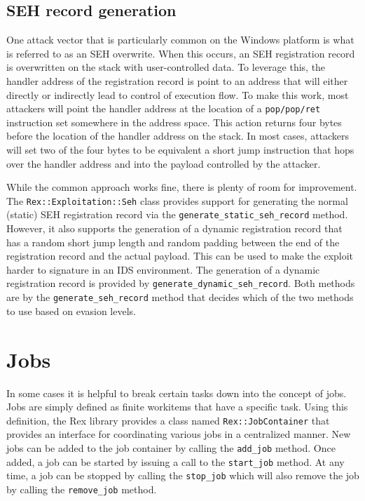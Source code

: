 \documentclass{report}
\begin{document}
        \subsection{SEH record generation}

\par
One attack vector that is particularly common on the Windows
platform is what is referred to as an SEH overwrite.  When this
occurs, an SEH registration record is overwritten on the stack with
user-controlled data.  To leverage this, the handler address of the
registration record is point to an address that will either directly
or indirectly lead to control of execution flow.  To make this work,
most attackers will point the handler address at the location of a
\texttt{pop/pop/ret} instruction set somewhere in the address space.
This action returns four bytes before the location of the handler
address on the stack.  In most cases, attackers will set two of the
four bytes to be equivalent a short jump instruction that hops over
the handler address and into the payload controlled by the attacker.

\par
While the common approach works fine, there is plenty of room for
improvement.  The \texttt{Rex::Exploitation::Seh} class provides
support for generating the normal (static) SEH registration record
via the \texttt{generate\_static\_seh\_record} method.  However, it
also supports the generation of a dynamic registration record that
has a random short jump length and random padding between the end of
the registration record and the actual payload.  This can be used to
make the exploit harder to signature in an IDS environment.  The
generation of a dynamic registration record is provided by
\texttt{generate\_dynamic\_seh\_record}.  Both methods are by the
\texttt{generate\_seh\_record} method that decides which of the two
methods to use based on evasion levels.

    \section{Jobs}
    \label{rex-jobs}

\par
In some cases it is helpful to break certain tasks down into the
concept of jobs.  Jobs are simply defined as finite workitems that
have a specific task.  Using this definition, the Rex library
provides a class named \texttt{Rex::JobContainer} that provides an
interface for coordinating various jobs in a centralized manner. New
jobs can be added to the job container by calling the
\texttt{add\_job} method.  Once added, a job can be started by
issuing a call to the \texttt{start\_job} method.  At any time, a
job can be stopped by calling the \texttt{stop\_job} which will also
remove the job by calling the \texttt{remove\_job} method.
\end{document}
